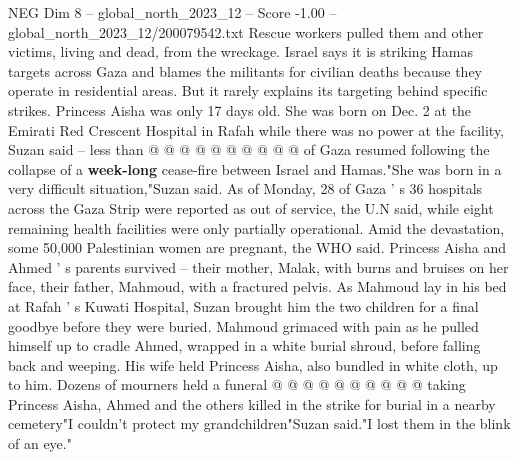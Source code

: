 \begin{textsample}{NEG Dim 8 – global\_north\_2023\_12 – Score -1.00 – global\_north\_2023\_12/200079542.txt}
Rescue workers pulled them and other victims, living and dead, from the wreckage.
Israel says it is striking Hamas targets across Gaza and blames the militants for civilian deaths because they operate in residential areas.
But it rarely explains its targeting behind specific strikes.
Princess Aisha was only 17 days old.
She was born on Dec. 2 at the Emirati Red Crescent Hospital in Rafah while there was no power at the facility, Suzan said -- less than @ @ @ @ @ @ @ @ @ @ of Gaza resumed following the collapse of a \textbf{week-long} cease-fire between Israel and Hamas."She was born in a very difficult situation,"Suzan said.
As of Monday, 28 of Gaza ' s 36 hospitals across the Gaza Strip were reported as out of service, the U.N said, while eight remaining health facilities were only partially operational.
Amid the devastation, some 50,000 Palestinian women are pregnant, the WHO said.
Princess Aisha and Ahmed ' s parents survived -- their mother, Malak, with burns and bruises on her face, their father, Mahmoud, with a fractured pelvis.
As Mahmoud lay in his bed at Rafah ' s Kuwati Hospital, Suzan brought him the two children for a final goodbye before they were buried.
Mahmoud grimaced with pain as he pulled himself up to cradle Ahmed, wrapped in a white burial shroud, before falling back and weeping.
His wife held Princess Aisha, also bundled in white cloth, up to him.
Dozens of mourners held a funeral @ @ @ @ @ @ @ @ @ @ taking Princess Aisha, Ahmed and the others killed in the strike for burial in a nearby cemetery"I couldn't protect my grandchildren"Suzan said."I lost them in the blink of an eye."

\end{textsample}
